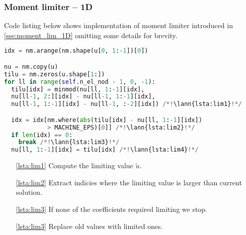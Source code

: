 \subsubsection{Moment limiter -- 1D}
\label{se:i_moment_lim_1D}
Code listing below shows implementation of moment limiter introduced in \ref{sse:moment_lim_1D} 
omitting some details for brevity.
\setcounter{lstannotation}{0}
\begin{lstlisting}[language=Python, caption=Moment limiter for 1D]
idx = nm.arange(nm.shape(u[0, 1:-1])[0])

nu = nm.copy(u)
tilu = nm.zeros(u.shape[1:])
for ll in range(self.n_el_nod - 1, 0, -1):
  tilu[idx] = minmod(nu[ll, 1:-1][idx], 
  nu[ll-1, 2:][idx] - nu[ll-1, 1:-1][idx],
  nu[ll-1, 1:-1][idx] - nu[ll-1, :-2][idx]) /*!\lann{lsta:lim1}!*/

  idx = idx[nm.where(abs(tilu[idx] - nu[ll, 1:-1][idx])
            > MACHINE_EPS)[0]] /*!\lann{lsta:lim2}!*/
  if len(idx) == 0:
    break /*!\lann{lsta:lim3}!*/
  nu[ll, 1:-1][idx] = tilu[idx] /*!\lann{lsta:lim4}!*/
\end{lstlisting}
\begin{itemize}
    \item [\ref{lsta:lim1}] Compute the limiting value $\tilde{u}$.
    \item [\ref{lsta:lim2}] Extract indicies where the limiting value is 
    larger than 
    current solution.
    \item[\ref{lsta:lim3}] If none of the coefficients required limiting we 
    stop.
    \item [\ref{lsta:lim3}] Replace old values with limited ones.
    
\end{itemize}

